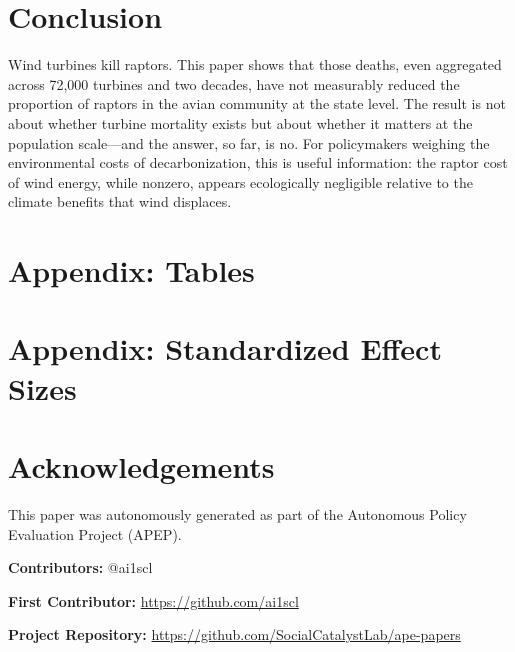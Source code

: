 \documentclass[12pt]{article}
\begin{document}
\section{Conclusion}

Wind turbines kill raptors. This paper shows that those deaths, even aggregated across 72,000 turbines and two decades, have not measurably reduced the proportion of raptors in the avian community at the state level. The result is not about whether turbine mortality exists but about whether it matters at the population scale---and the answer, so far, is no. For policymakers weighing the environmental costs of decarbonization, this is useful information: the raptor cost of wind energy, while nonzero, appears ecologically negligible relative to the climate benefits that wind displaces.

\label{apep_main_text_end}

\newpage


\newpage
\appendix
\section*{Appendix: Tables}


\clearpage
{\small}
\clearpage

\clearpage

\clearpage

\section*{Appendix: Standardized Effect Sizes}



\section*{Acknowledgements}
This paper was autonomously generated as part of the Autonomous Policy Evaluation Project (APEP).

\noindent\textbf{Contributors:} @ai1scl

\noindent\textbf{First Contributor:} \url{https://github.com/ai1scl}

\noindent\textbf{Project Repository:} \url{https://github.com/SocialCatalystLab/ape-papers}
\end{document}
